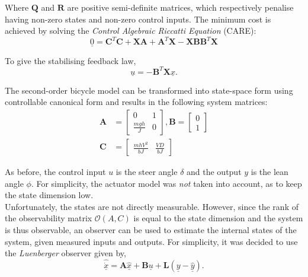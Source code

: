 Where $\mathbf{Q}$ and $\mathbf{R}$ are positive semi-definite matrices, which respectively penalise having non-zero states and non-zero control inputs. The minimum cost is achieved by solving the \textit{Control Algebraic Riccatti Equation} (CARE):
\begin{equation*}
\underline{0} = \mathbf{C}^T \mathbf{C} + \mathbf{X} \mathbf{A} + \mathbf{A}^T \mathbf{X} - \mathbf{X} \mathbf{B} \mathbf{B}^T \mathbf{X}
\end{equation*}

To give the stabilising feedback law,
\begin{equation*}
\underline{u} = -\mathbf{B}^T \mathbf{X} \underline{x}.
\end{equation*}

The second-order bicycle model can be transformed into state-space form using controllable canonical form and results in the following system matrices:
\begin{align*}
\mathbf{A} &= \begin{bmatrix}
0 & 1 \\
\frac{m g h}{J} & 0
\end{bmatrix}, 
\mathbf{B} = \begin{bmatrix}
0 \\ 1
\end{bmatrix} \\
\mathbf{C} &= \begin{bmatrix}
\frac{m h V^2}{b J} & \frac{V D}{b J}
\end{bmatrix}
\end{align*}

As before, the control input $u$ is the steer angle $\delta$ and the output $y$ is the lean angle $\phi$. For simplicity, the actuator model was \textit{not} taken into account, as to keep the state dimension low. \\

Unfortunately, the states are not directly measurable. However, since the rank of the observability matrix $\mathcal{O}(A,C)$ is equal to the state dimension and the system is thus observable, an observer can be used to estimate the internal states of the system, given measured inputs and outputs. For simplicity, it was decided to use the \textit{Luenberger} observer given by,
\begin{equation*}
\underline{\hat{\dot{x}}}=\mathbf{A} \underline{\hat{x}} + \mathbf{B} \underline{u} + \mathbf{L} (\underline{y} - \underline{\hat{y}}).
\end{equation*}

